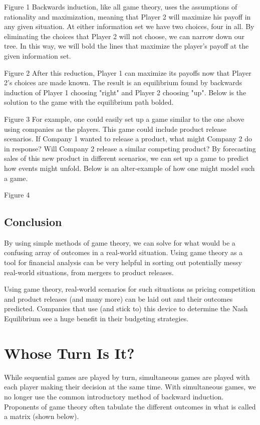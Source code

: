 Figure 1
Backwards induction, like all game theory, uses the assumptions of rationality and maximization, meaning that Player 2 will maximize his payoff in any given situation. At either information set we have two choices, four in all. By eliminating the choices that Player 2 will not choose, we can narrow down our tree. In this way, we will bold the lines that maximize the player's payoff at the given information set.


Figure 2
After this reduction, Player 1 can maximize its payoffs now that Player 2's choices are made known. The result is an equilibrium found by backwards induction of Player 1 choosing "right" and Player 2 choosing "up". Below is the solution to the game with the equilibrium path bolded.


Figure 3
For example, one could easily set up a game similar to the one above using companies as the players. This game could include product release scenarios. If Company 1 wanted to release a product, what might Company 2 do in response? Will Company 2 release a similar competing product? By forecasting sales of this new product in different scenarios, we can set up a game to predict how events might unfold. Below is an alter-example of how one might model such a game.



Figure 4

\subsection{Conclusion}
By using simple methods of game theory, we can solve for what would be a confusing array 
of outcomes in a real-world situation. Using game theory as a tool for financial analysis can be very helpful in sorting out potentially messy real-world situations, from mergers to product releases.


Using game theory, real-world scenarios for such situations as pricing competition and 
product releases (and many more) can be laid out and their outcomes predicted. 
Companies that use (and stick to) this device to determine the Nash Equilibrium see a 
huge benefit in their budgeting strategies.

\section{Whose Turn Is It?}
While sequential games are played by turn, simultaneous games are played with each player making their decision at the same time. With simultaneous games, we no longer use the common introductory method of backward induction. Proponents of game theory often tabulate the different outcomes in what is called a matrix (shown below).

